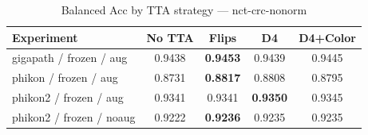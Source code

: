 \begin{table}[ht]
\centering
\caption{Balanced Acc by TTA strategy — nct-crc-nonorm}
\begin{tabular}{lcccc}
\toprule
  Experiment & No TTA & Flips & D4 & D4+Color \\
\midrule
  gigapath / frozen / aug & 0.9438 & \textbf{0.9453} & 0.9439 & 0.9445 \\
  phikon / frozen / aug & 0.8731 & \textbf{0.8817} & 0.8808 & 0.8795 \\
  phikon2 / frozen / aug & 0.9341 & 0.9341 & \textbf{0.9350} & 0.9345 \\
  phikon2 / frozen / noaug & 0.9222 & \textbf{0.9236} & 0.9235 & 0.9235 \\
\bottomrule
\end{tabular}
\end{table}